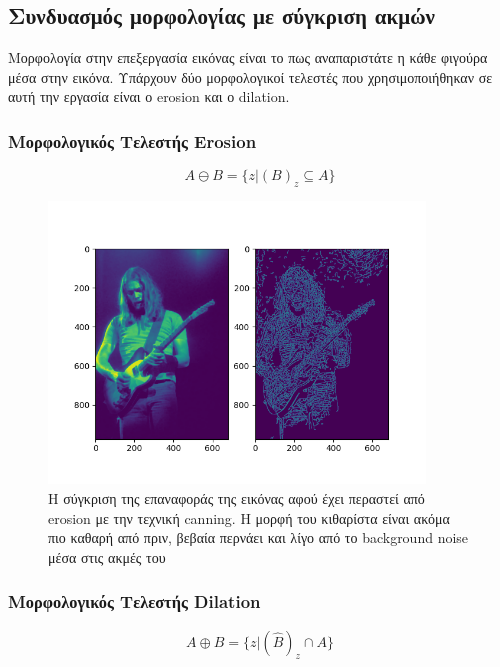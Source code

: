 \subsection{Συνδυασμός μορφολογίας με σύγκριση ακμών}

Μορφολογία στην επεξεργασία εικόνας είναι το πως αναπαριστάτε η κάθε φιγούρα μέσα στην εικόνα. Υπάρχουν δύο μορφολογικοί τελεστές που χρησιμοποιήθηκαν σε αυτή την εργασία είναι ο erosion και ο dilation.

\subsubsection{Μορφολογικός Τελεστής Erosion}

\begin{equation}
  Α \ominus Β = \{ z | (Β)_z \subseteq Α \}
\end{equation}

\begin{figure}[H]
  \centering
  \includegraphics[width=100mm]{Figures/Erosion}
  \caption[Η σύγκριση της επαναφοράς της εικόνας αφού έχει περαστεί απο erosion με την τεχνική canning]{Η σύγκριση της επαναφοράς της εικόνας αφού έχει περαστεί από erosion με την τεχνική canning. Η μορφή του κιθαρίστα είναι ακόμα πιο καθαρή από πριν, βεβαία περνάει και λίγο από το background noise μέσα στις ακμές του}
  \label{fig:erosion}
\end{figure}

\newpage
\subsubsection{Μορφολογικός Τελεστής Dilation}

\begin{equation}
  Α \oplus Β = \{ z | (\hat{Β})_z \cap Α \}
\end{equation}

